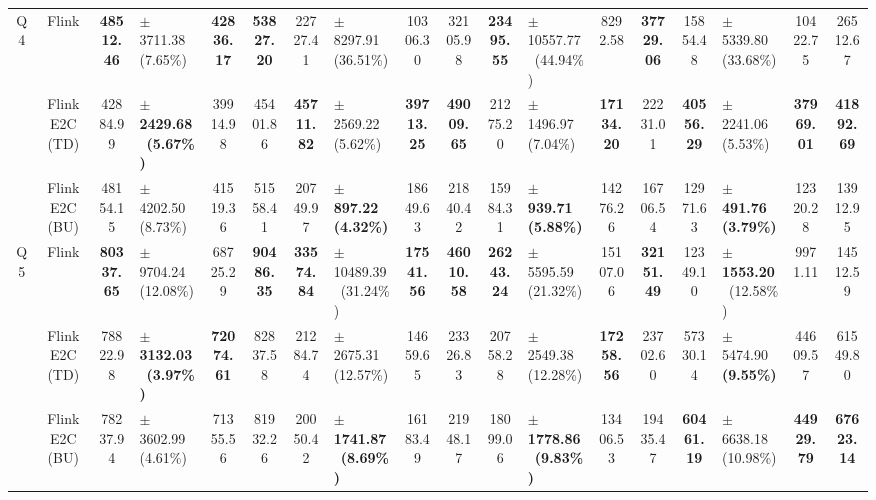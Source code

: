 \begin{tabular}{@{} c c c l c c c l c c c l c c c l c c @{}}
  \multirow{3}{*}{Q4} & Flink & {\bfseries \num{48512.46}} & $\pm$ \num{3711.38}~(\num{7.65}\%) & {\bfseries \num{42836.17}} & {\bfseries \num{53827.20}} & \num{22727.41} & $\pm$ \num{8297.91}~(\num{36.51}\%) & \num{10306.30} & \num{32105.98} & {\bfseries \num{23495.55}} & $\pm$ \num{10557.77}~(\num{44.94}\%) & \num{8292.58} & {\bfseries \num{37729.06}} & \num{15854.48} & $\pm$ \num{5339.80}~(\num{33.68}\%) & \num{10422.75} & \num{26512.67} \\
   & FlinkE2C (TD) & \num{42884.99} & $\pm$ {\bfseries \num{2429.68}}~{\bfseries (\num{5.67}\%)} & \num{39914.98} & \num{45401.86} & {\bfseries \num{45711.82}} & $\pm$ \num{2569.22}~(\num{5.62}\%) & {\bfseries \num{39713.25}} & {\bfseries \num{49009.65}} & \num{21275.20} & $\pm$ \num{1496.97}~(\num{7.04}\%) & {\bfseries \num{17134.20}} & \num{22231.01} & {\bfseries \num{40556.29}} & $\pm$ \num{2241.06}~(\num{5.53}\%) & {\bfseries \num{37969.01}} & {\bfseries \num{41892.69}} \\
   & FlinkE2C (BU) & \num{48154.15} & $\pm$ \num{4202.50}~(\num{8.73}\%) & \num{41519.36} & \num{51558.41} & \num{20749.97} & $\pm$ {\bfseries \num{897.22}}~{\bfseries (\num{4.32}\%)} & \num{18649.63} & \num{21840.42} & \num{15984.31} & $\pm$ {\bfseries \num{939.71}}~{\bfseries (\num{5.88}\%)} & \num{14276.26} & \num{16706.54} & \num{12971.63} & $\pm$ {\bfseries \num{491.76}}~{\bfseries (\num{3.79}\%)} & \num{12320.28} & \num{13912.95} \\
  \cmidrule(lr){1-18}
  \multirow{3}{*}{Q5} & Flink & {\bfseries \num{80337.65}} & $\pm$ \num{9704.24}~(\num{12.08}\%) & \num{68725.29} & {\bfseries \num{90486.35}} & {\bfseries \num{33574.84}} & $\pm$ \num{10489.39}~(\num{31.24}\%) & {\bfseries \num{17541.56}} & {\bfseries \num{46010.58}} & {\bfseries \num{26243.24}} & $\pm$ \num{5595.59}~(\num{21.32}\%) & \num{15107.06} & {\bfseries \num{32151.49}} & \num{12349.10} & $\pm$ {\bfseries \num{1553.20}}~(\num{12.58}\%) & \num{9971.11} & \num{14512.59} \\
   & FlinkE2C (TD) & \num{78822.98} & $\pm$ {\bfseries \num{3132.03}}~{\bfseries (\num{3.97}\%)} & {\bfseries \num{72074.61}} & \num{82837.58} & \num{21284.74} & $\pm$ \num{2675.31}~(\num{12.57}\%) & \num{14659.65} & \num{23326.83} & \num{20758.28} & $\pm$ \num{2549.38}~(\num{12.28}\%) & {\bfseries \num{17258.56}} & \num{23702.60} & \num{57330.14} & $\pm$ \num{5474.90}~{\bfseries (\num{9.55}\%)} & \num{44609.57} & \num{61549.80} \\
   & FlinkE2C (BU) & \num{78237.94} & $\pm$ \num{3602.99}~(\num{4.61}\%) & \num{71355.56} & \num{81932.26} & \num{20050.42} & $\pm$ {\bfseries \num{1741.87}}~{\bfseries (\num{8.69}\%)} & \num{16183.49} & \num{21948.17} & \num{18099.06} & $\pm$ {\bfseries \num{1778.86}}~{\bfseries (\num{9.83}\%)} & \num{13406.53} & \num{19435.47} & {\bfseries \num{60461.19}} & $\pm$ \num{6638.18}~(\num{10.98}\%) & {\bfseries \num{44929.79}} & {\bfseries \num{67623.14}} \\

\end{tabular}
